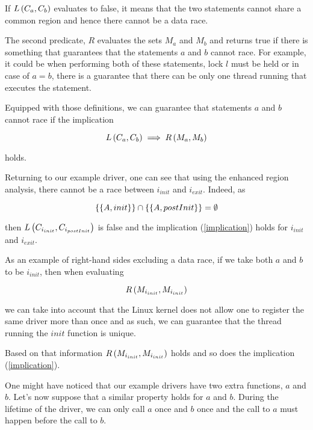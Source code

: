 \documentclass[..thesis.tex]{subfiles}
\begin{document}
If $L \left( C_a, C_b \right)$ evaluates to false, it means that the two statements cannot share a common region and hence there cannot be a data race. 

The second predicate, $R$ evaluates the sets $M_a$ and $M_b$ and returns true if there is something that guarantees that the statements $a$ and $b$ cannot race.
For example, it could be when performing both of these statements, lock $l$ must be held or in case of $a=b$,
there is a guarantee that there can be only one thread running that executes the statement.

Equipped with those definitions, we can guarantee that statements $a$ and $b$ cannot race if the implication

\begin{equation}
\label{implication}
L \left( C_a, C_b \right) \implies R \left( M_a, M_b \right)  
\end{equation}

holds.

Returning to our example driver, one can see that using the enhanced region analysis, there cannot be a race between $i_{init}$ and $i_{exit}$.
Indeed, as

\begin{equation*}
 \left\lbrace \left\lbrace A, init \right\rbrace \right\rbrace \cap  \left\lbrace \left\lbrace A, postInit \right\rbrace \right\rbrace = \emptyset
\end{equation*}

then $L \left( C_{i_{init}}, C_{i_{postInit}} \right)$ is false and the implication (\ref{implication}) holds for $i_{init}$ and $i_{exit}$.

As an example of right-hand sides excluding a data race, if we take both $a$ and $b$ to be $i_{init}$, then when evaluating 

\begin{equation*}
R \left( M_{i_{init}}, M_{i_{init}} \right)
\end{equation*} 

we can take into account that the Linux kernel does not allow one to register the same driver more than once and as such,
we can guarantee that the thread running the $init$ function is unique.

Based on that information $R \left( M_{i_{init}}, M_{i_{init}} \right)$ holds and so does the implication (\ref{implication}).


One might have noticed that our example drivers have two extra functions, $a$ and $b$. Let's now suppose that a similar property holds for $a$ and $b$. During the lifetime of the driver, we can only call $a$ once and $b$ once and the call to $a$  must happen before the call to $b$.
\end{document}
